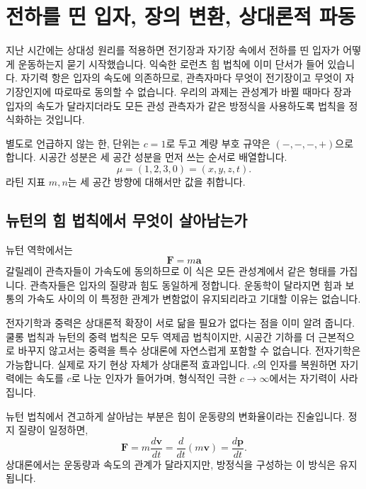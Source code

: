 \chapter{전하를 띤 입자, 장의 변환, 상대론적 파동}

지난 시간에는 상대성 원리를 적용하면 전기장과 자기장 속에서 전하를 띤 입자가 어떻게 운동하는지 묻기 시작했습니다. 익숙한 로런츠 힘 법칙에 이미 단서가 들어 있습니다. 자기력 항은 입자의 속도에 의존하므로, 관측자마다 무엇이 전기장이고 무엇이 자기장인지에 따로따로 동의할 수 없습니다. 우리의 과제는 관성계가 바뀔 때마다 장과 입자의 속도가 달라지더라도 모든 관성 관측자가 같은 방정식을 사용하도록 법칙을 정식화하는 것입니다.

별도로 언급하지 않는 한, 단위는 \(c=1\)로 두고 계량 부호 규약은 \((-,-,-,+)\)으로 합니다. 시공간 성분은 세 공간 성분을 먼저 쓰는 순서로 배열합니다.
\begin{equation}
  \mu=(1,2,3,0)=(x,y,z,t).
\end{equation}
라틴 지표 \(m,n\)는 세 공간 방향에 대해서만 값을 취합니다.

\section{뉴턴의 힘 법칙에서 무엇이 살아남는가}

뉴턴 역학에서는
\begin{equation}
  \boldsymbol F=m\boldsymbol a
\end{equation}
갈릴레이 관측자들이 가속도에 동의하므로 이 식은 모든 관성계에서 같은 형태를 가집니다. 관측자들은 입자의 질량과 힘도 동일하게 정합니다. 운동학이 달라지면 힘과 보통의 가속도 사이의 이 특정한 관계가 변함없이 유지되리라고 기대할 이유는 없습니다.

전자기학과 중력은 상대론적 확장이 서로 닮을 필요가 없다는 점을 이미 알려 줍니다. 쿨롱 법칙과 뉴턴의 중력 법칙은 모두 역제곱 법칙이지만, 시공간 기하를 더 근본적으로 바꾸지 않고서는 중력을 특수 상대론에 자연스럽게 포함할 수 없습니다. 전자기학은 가능합니다. 실제로 자기 현상 자체가 상대론적 효과입니다. \(c\)의 인자를 복원하면 자기력에는 속도를 \(c\)로 나눈 인자가 들어가며, 형식적인 극한 \(c\to\infty\)에서는 자기력이 사라집니다.

뉴턴 법칙에서 견고하게 살아남는 부분은 힘이 운동량의 변화율이라는 진술입니다. 정지 질량이 일정하면,
\begin{equation}
  \boldsymbol F
  =m\frac{d\boldsymbol v}{dt}
  =\frac{d}{dt}(m\boldsymbol v)
  =\frac{d\boldsymbol p}{dt}.
\end{equation}
상대론에서는 운동량과 속도의 관계가 달라지지만, 방정식을 구성하는 이 방식은 유지됩니다.

